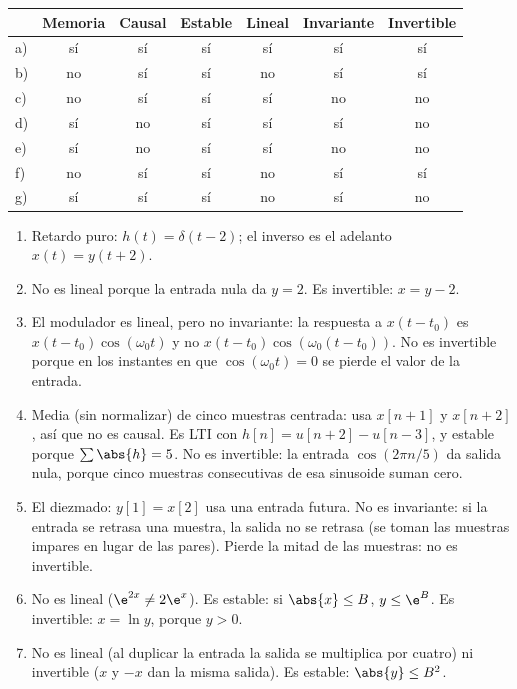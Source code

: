 \documentclass[11pt,a4paper]{scrartcl}
\begin{document}
\begin{solucion}
  \begin{center}
    \small
    \begin{tabular}{@{}lcccccc@{}}
      \toprule
      & Memoria & Causal & Estable & Lineal & Invariante & Invertible\\\midrule
      a) & sí & sí & sí & sí & sí & sí\\
      b) & no & sí & sí & no & sí & sí\\
      c) & no & sí & sí & sí & no & no\\
      d) & sí & no & sí & sí & sí & no\\
      e) & sí & no & sí & sí & no & no\\
      f) & no & sí & sí & no & sí & sí\\
      g) & sí & sí & sí & no & sí & no\\\bottomrule
    \end{tabular}
  \end{center}
  \begin{enumerate}[label=\alph*)]
    \item Retardo puro: $h(t)=\delta(t-2)$; el inverso es el adelanto $x(t)=y(t+2)$.
    \item No es lineal porque la entrada nula da $y=2$. Es invertible: $x=y-2$.
    \item El modulador es lineal, pero no invariante: la respuesta a $x(t-t_0)$ es $x(t-t_0)\cos(\omega_0t)$ y no $x(t-t_0)\cos(\omega_0(t-t_0))$. No es invertible porque en los instantes en que $\cos(\omega_0t)=0$ se pierde el valor de la entrada.
    \item Media (sin normalizar) de cinco muestras centrada: usa $x[n+1]$ y $x[n+2]$, así que no es causal. Es LTI con $h[n]=u[n+2]-u[n-3]$, y estable porque $\sum\abs{h}=5$. No es invertible: la entrada $\cos(2\pi n/5)$ da salida nula, porque cinco muestras consecutivas de esa sinusoide suman cero.
    \item El diezmado: $y[1]=x[2]$ usa una entrada futura. No es invariante: si la entrada se retrasa una muestra, la salida no se retrasa (se toman las muestras impares en lugar de las pares). Pierde la mitad de las muestras: no es invertible.
    \item No es lineal ($\e^{2x}\ne2\e^{x}$). Es estable: si $\abs{x}\le B$, $y\le\e^B$. Es invertible: $x=\ln y$, porque $y>0$.
    \item No es lineal (al duplicar la entrada la salida se multiplica por cuatro) ni invertible ($x$ y $-x$ dan la misma salida). Es estable: $\abs{y}\le B^2$.
  \end{enumerate}
\end{solucion}
\end{document}
